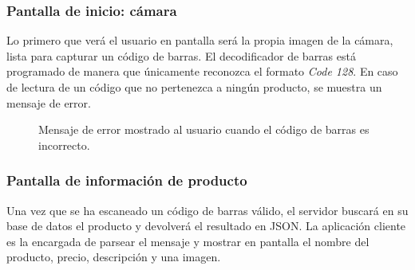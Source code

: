 
\subsubsection{Pantalla de inicio: cámara}
Lo primero que verá el usuario en pantalla será la propia imagen de la cámara, lista para capturar un código de barras. El decodificador de barras está programado de manera que únicamente reconozca el formato \emph{Code 128}. En caso de lectura de un código que no pertenezca a ningún producto, se muestra un mensaje de error.

\begin{figure}[H]
	\centering
	\caption{Mensaje de error mostrado al usuario cuando el código de barras es incorrecto.}
	\label{fig:codigoBarrasError}
\end{figure}

\subsubsection{Pantalla de información de producto}
Una vez que se ha escaneado un código de barras válido, el servidor buscará en su base de datos el producto y devolverá el resultado en JSON. La aplicación cliente es la encargada de parsear el mensaje y mostrar en pantalla el nombre del producto, precio, descripción y una imagen.

